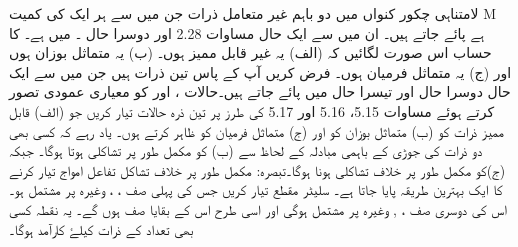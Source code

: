 لامتناہی چکور کنواں میں دو باہم غیر متعامل ذرات جن میں سے ہر ایک کی کمیت M ہے پائے جاتے ہیں۔ ان میں سے ایک حال  مساوات 2.28 اور دوسرا حال  ۔   میں ہے۔  کا حساب اس صورت لگائیں کہ (الف) یہ غیر قابل ممیز ہوں۔ (ب) یہ متماثل بوزان ہوں اور (ج) یہ متماثل فرمیان ہوں۔
فرض کریں آپ کے پاس تین ذرات ہیں جن میں سے ایک حال  دوسرا حال  اور تیسرا حال  میں پائے جاتے ہیں۔حالات  ،  اور  کو معیاری عمودی تصور کرتے  ہوئے  مساوات 5.15، 5.16 اور 5.17 کی طرز پر تین ذرہ حالات تیار کریں جو (الف) قابل ممیز ذرات کو (ب) متماثل بوزان کو اور (ج) متماثل فرمیان کو ظاہر کرتے ہوں۔ یاد رہے کہ کسی بھی دو ذرات کی جوڑی کے باہمی مبادلہ کے لحاظ سے (ب) کو مکمل طور پر تشاکلی ہوتا ہوگا۔ جبکہ (ج)کو مکمل طور پر خلاف تشاکلی ہونا ہوگا۔تبصرہ: مکمل طور پر خلاف تشاکل تفاعل امواج تیار کرنے کا ایک بہترین طریقہ پایا جاتا ہے۔ سلیٹر مقطع  تیار کریں جس کی پہلی صف   ،  ،  وغیرہ پر مشتمل ہو۔ اس کی دوسری صف  ،  ,  وغیرہ پر مشتمل ہوگی اور اسی طرح اس کے بقایا صف ہوں گے۔ یہ نقطہ کسی بھی تعداد کے ذرات کیلۓ کارآمد ہوگا۔

